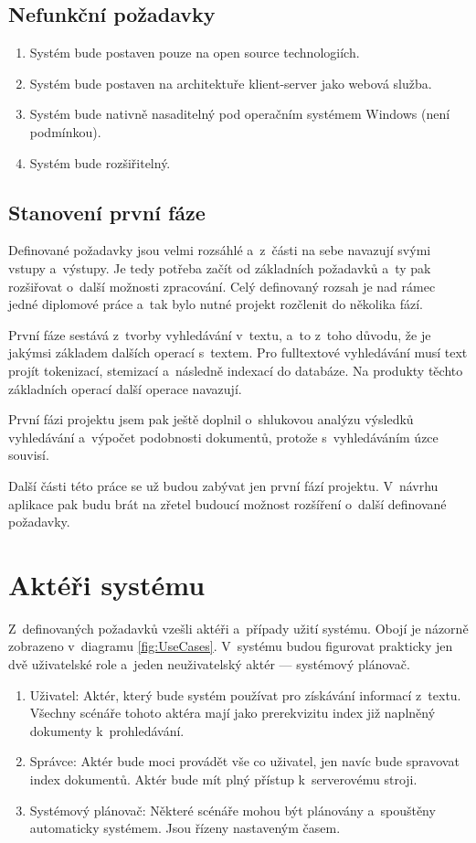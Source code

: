 \subsection{Nefunkční požadavky}
\label{req_1}
\begin{enumerate}
	\item \label{req_10} Systém bude postaven pouze na open source technologiích.
	\item \label{req_11} Systém bude postaven na architektuře klient-server jako webová služba.
	\item \label{req_12} Systém bude nativně nasaditelný pod operačním systémem Windows (není podmínkou).
	\item \label{req_13} Systém bude rozšiřitelný.
\end{enumerate}

\subsection{Stanovení první fáze}
Definované požadavky jsou velmi rozsáhlé a~z~části na sebe navazují svými vstupy a~výstupy. Je tedy potřeba začít od základních požadavků a~ty pak rozšiřovat o~další možnosti zpracování. Celý definovaný rozsah je nad rámec jedné diplomové práce a~tak bylo nutné projekt rozčlenit do několika fází.

První fáze sestává z~tvorby vyhledávání v~textu, a~to z~toho důvodu, že je jakýmsi základem dalších operací s~textem. Pro fulltextové vyhledávání musí text projít tokenizací, stemizací a~následně indexací do databáze. Na produkty těchto základních operací další operace navazují.

První fázi projektu jsem pak ještě doplnil o~shlukovou analýzu výsledků vyhledávání a~výpočet podobnosti dokumentů, protože s~vyhledáváním úzce souvisí.

Další části této práce se už budou zabývat jen první fází projektu. V~návrhu aplikace pak budu brát na zřetel budoucí možnost rozšíření o~další definované požadavky.

\section{Aktéři systému}
Z~definovaných požadavků vzešli aktéři a~případy užití systému. Obojí je názorně zobrazeno v~diagramu \ref{fig:UseCases}. V~systému budou figurovat prakticky jen dvě uživatelské role a~jeden neuživatelský aktér --- systémový plánovač.

\begin{enumerate}
	\item \label{itm:actor_user}Uživatel: Aktér, který bude systém používat pro získávání informací z~textu. Všechny scénáře tohoto aktéra mají jako prerekvizitu index již naplněný dokumenty k~prohledávání.
	\item \label{itm:actor_admin}Správce: Aktér bude moci provádět vše co uživatel, jen navíc bude spravovat index dokumentů. Aktér bude mít plný přístup k~serverovému stroji.
	\item \label{itm:actor_scheduler}Systémový plánovač: Některé scénáře mohou být plánovány a~spouštěny automaticky systémem. Jsou řízeny nastaveným časem.
\end{enumerate}

